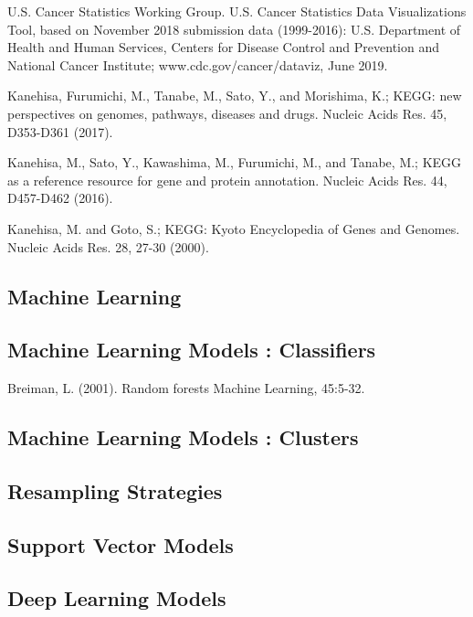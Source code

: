
\begin{thebibliography}{00}

U.S. Cancer Statistics Working Group. U.S. Cancer Statistics Data Visualizations Tool, based on November 2018 submission data (1999-2016): 
\newblock U.S. Department of Health and Human Services, Centers for Disease Control and Prevention and National Cancer Institute; 
\newblock www.cdc.gov/cancer/dataviz, June 2019.

 Kanehisa, Furumichi, M., Tanabe, M., Sato, Y., and Morishima, K.; 
\newblock KEGG: new perspectives on genomes, pathways, diseases and drugs. 
\newblock Nucleic Acids Res. 45, D353-D361 (2017).

 Kanehisa, M., Sato, Y., Kawashima, M., Furumichi, M., and Tanabe, M.; 
\newblock KEGG as a reference resource for gene and protein annotation. 
\newblock Nucleic Acids Res. 44, D457-D462 (2016).

 Kanehisa, M. and Goto, S.; 
\newblock KEGG: Kyoto Encyclopedia of Genes and Genomes. 
\newblock Nucleic Acids Res. 28, 27-30 (2000). 

\subsection{Machine Learning}

\subsection{Machine Learning Models : Classifiers}
Breiman, L. (2001). 
\newblock Random forests
\newblock Machine Learning, 45:5-32.

\subsection{Machine Learning Models : Clusters}

\subsection{Resampling Strategies}

\subsection{Support Vector Models}

\subsection{Deep Learning Models}


\end{thebibliography}
